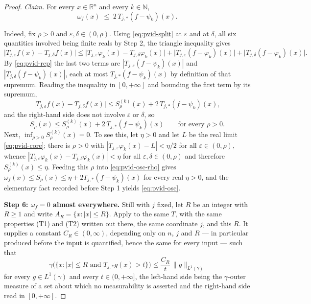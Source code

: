 \begin{proof}
\emph{Claim.}  For every $x \in \mathbb{R}^n$ and every $k \in \mathbb{N}$,
\begin{equation}\label{eq:pvid-osc}
  \omega_f(x) \;\leq\; 2\,T_{j,*}(f-\psi_k)(x) .
\end{equation}

Indeed, fix $\rho > 0$ and $\varepsilon,\delta \in (0,\rho)$.  Using
\eqref{eq:pvid-split} at $\varepsilon$ and at $\delta$, all six quantities
involved being finite reals by Step 2, the triangle inequality gives
\[
  \bigl|T_{j,\varepsilon}f(x) - T_{j,\delta}f(x)\bigr|
    \leq \bigl|T_{j,\varepsilon}\varphi_k(x) - T_{j,\delta}\varphi_k(x)\bigr|
      + \bigl|T_{j,\varepsilon}(f-\varphi_k)(x)\bigr|
      + \bigl|T_{j,\delta}(f-\varphi_k)(x)\bigr| .
\]
By \eqref{eq:pvid-rep} the last two terms are
$|T_{j,\varepsilon}(f-\psi_k)(x)|$ and $|T_{j,\delta}(f-\psi_k)(x)|$, each at
most $T_{j,*}(f-\psi_k)(x)$ by definition of that supremum.  Reading the
inequality in $[0,+\infty]$ and bounding the first term by its supremum,
\[
  \bigl|T_{j,\varepsilon}f(x) - T_{j,\delta}f(x)\bigr|
    \leq S^{(k)}_\rho(x) + 2\,T_{j,*}(f-\psi_k)(x) ,
\]
and the right-hand side does not involve $\varepsilon$ or $\delta$, so
\begin{equation}\label{eq:pvid-osc-rho}
  S_\rho(x) \leq S^{(k)}_\rho(x) + 2\,T_{j,*}(f-\psi_k)(x)
  \qquad\text{for every }\rho > 0 .
\end{equation}
Next, $\inf_{\rho>0}S^{(k)}_\rho(x) = 0$.  To see this, let $\eta > 0$ and let
$L$ be the real limit \eqref{eq:pvid-core}; there is $\rho > 0$ with
$|T_{j,\varepsilon}\varphi_k(x) - L| < \eta/2$ for all
$\varepsilon \in (0,\rho)$, whence
$|T_{j,\varepsilon}\varphi_k(x) - T_{j,\delta}\varphi_k(x)| < \eta$ for all
$\varepsilon,\delta \in (0,\rho)$ and therefore $S^{(k)}_\rho(x) \leq \eta$.
Feeding this $\rho$ into \eqref{eq:pvid-osc-rho} gives
$\omega_f(x) \leq S_\rho(x) \leq \eta + 2T_{j,*}(f-\psi_k)(x)$ for every real
$\eta > 0$, and the elementary fact recorded before Step 1 yields
\eqref{eq:pvid-osc}.

\medskip
\noindent\textbf{Step 6: $\omega_f = 0$ almost everywhere.}
Still with $j$ fixed, let $R$ be an integer with $R \geq 1$ and write
$A_R = \{x : |x| \leq R\}$.  Apply
 to the same $T$, with the same
properties (T1) and (T2) written out there, the same coordinate $j$, and this
$R$.  It supplies a constant $C_R \in (0,\infty)$, depending only on $n$, $j$
and $R$ --- in particular produced before the input is quantified, hence the
same for every input --- such that
\begin{equation}\label{eq:pvid-maximal}
  \gamma\bigl(\{x : |x| \leq R \text{ and } T_{j,*}g(x) > t\}\bigr)
    \leq \frac{C_R}{t}\,\|g\|_{L^1(\gamma)}
\end{equation}
for every $g \in L^1(\gamma)$ and every $t \in (0,+\infty]$, the left-hand
side being the $\gamma$-outer measure of a set about which no measurability is
asserted and the right-hand side read in $[0,+\infty]$.


\end{proof}
